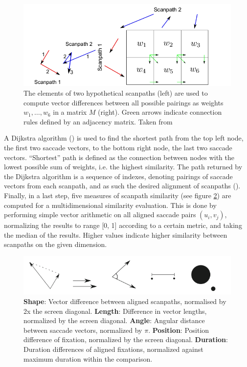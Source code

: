 \documentclass[a4paper, 12pt]{scrreprt}
\begin{document}
\begin{figure}
	\includegraphics[scale=0.4]{img/weightedgraph.png}
	\caption[Scanpath alignment as a shortest-path-problem]
	{\small{The elements of two hypothetical scanpaths (left) are used to compute vector differences between all possible pairings as weights $w_1, \ldots, w_6$ in a matrix $M$ (right). Green arrows indicate connection rules defined by an adjacency matrix. Taken from \textcite{jarodzka2010vector}}}
	\label{fig:directedgraph}
\end{figure}

A Dijkstra algorithm (\cite{dijkstra1959note}) is used to find the shortest path from the top left node, the first two saccade vectors, to the bottom right node, the last two saccade vectors. “Shortest” path is defined as the connection between nodes with the lowest possible sum of weights, i.e. the highest similarity. The path returned by the Dijkstra algorithm is a sequence of indexes, denoting pairings of saccade vectors from each scanpath, and as such the desired alignment of scanpaths (\cite{dewhurst2012depends}).  Finally, in a last step, five measures of scanpath similarity (see figure \ref{fig:simmeasures}) are computed for a multidimensional similarity evaluation. This is done by performing simple vector arithmetic on all aligned saccade pairs $(u_i, v_j)$, normalizing the results to range [0, 1] according to a certain metric, and taking the median of the results. Higher values indicate higher similarity between scanpaths on the given dimension. \newline

\begin{figure}[H]
	\includegraphics[scale=0.5]{img/simmeasures.png}
	\caption[Similarity measures]{\small{\textbf{Shape}: Vector difference between aligned scanpaths, normalised by 2x the screen diagonal. \textbf{Length}: Difference in vector lengths, normalized by the screen diagonal. \textbf{Angle}: Angular distance between saccade vectors, normalized by $\pi$. \textbf{Position}: Position difference of fixation, normalized by the screen diagonal. \textbf{Duration}: Duration differences of aligned fixations, normalized against maximum duration within the comparison.}}
	\label{fig:simmeasures}
\end{figure}
\end{document}
